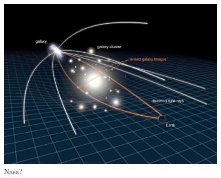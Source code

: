 \begin{figure}[H]
\centering
\includegraphics[width=12cm]{images/strong_lensing.jpg}
\caption[Strong Lensing representation]{Nasa?}
\end{figure}




